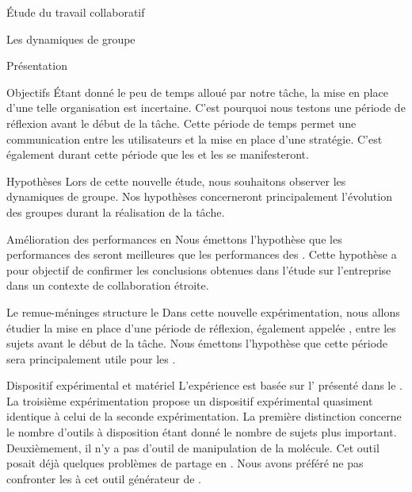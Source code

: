 \documentclass[myfrancais]{mythesis}
\begin{document}
\begin{mypart}{Étude du travail collaboratif}
\begin{mychapter}{Les dynamiques de groupe}
\begin{mysection}{Présentation}
\begin{mysubsection}{Objectifs}
					Étant donné le peu de temps alloué par notre tâche, la mise en place d'une telle organisation est incertaine.
					C'est pourquoi nous testons une période de réflexion avant le début de la tâche.
					Cette période de temps permet une communication entre les utilisateurs et la mise en place d'une stratégie.
					C'est également durant cette période que les  et les  se manifesteront.
				\end{mysubsection}
				\begin{mysubsection}{Hypothèses}
					Lors de cette nouvelle étude, nous souhaitons observer les dynamiques de groupe.
					Nos hypothèses concerneront principalement l'évolution des groupes durant la réalisation de la tâche.
					\begin{myparagraph}{ Amélioration des performances en }
						Nous émettons l'hypothèse que les performances des  seront meilleures que les performances des .
						Cette hypothèse a pour objectif de confirmer les conclusions obtenues dans l'étude sur l'entreprise \myHawthorne dans un contexte de collaboration étroite.
					\end{myparagraph}
					\begin{myparagraph}{ Le remue-méninges structure le }
						Dans cette nouvelle expérimentation, nous allons étudier la mise en place d'une période de réflexion, également appelée , entre les sujets avant le début de la tâche.
						Nous émettons l'hypothèse que cette période sera principalement utile pour les .
					\end{myparagraph}
				\end{mysubsection}
			\end{mysection}
			\begin{mysection}{Dispositif expérimental et matériel}
				L'expérience est basée sur l' présenté dans le .
				La troisième expérimentation propose un dispositif expérimental quasiment identique à celui de la seconde expérimentation.
				La première distinction concerne le nombre d'outils à disposition étant donné le nombre de sujets plus important.
				Deuxièmement, il n'y a pas d'outil de manipulation de la molécule.
				Cet outil posait déjà quelques problèmes de partage en .
				Nous avons préféré ne pas confronter les  à cet outil générateur de .


\end{mysection}
\end{mychapter}
\end{mypart}
\end{document}
